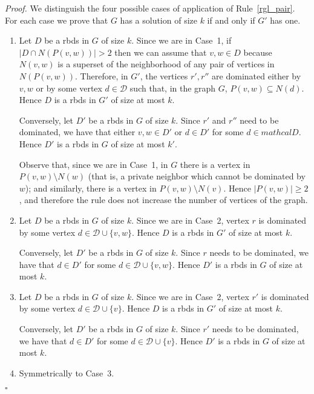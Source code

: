 \documentclass[a4paper,11pt]{article}
\newcommand{\rrgl}   [1] {Rule~\ref{#1}\xspace}
\newcommand{\drb}    [0] {rbds\xspace}
\newenvironment{proof}{\noindent \textit{Proof. }}{\hfill$\square$\vspace{.2cm}}
\begin{document}
\begin{proof}
We distinguish the four possible cases of application of \rrgl{rgl_pair}. For each case we prove that $G$ has a solution of size $k$ if and only if $G'$ has one.

\begin{enumerate}\itemsep0em
\item
Let $D$ be a \drb in $G$ of size $k$.
Since we are in Case~1, if $|D\cap N(P(v,w))| > 2$ then we can assume that $v,w \in D$ because $N(v,w)$ is a superset of the neighborhood of any pair of vertices in $N(P(v,w))$.
Therefore, in $G'$, the vertices $r',r''$ are dominated either by $v,w$ or by some vertex $d \in \mathcal{D}$ such that, in the graph $G$,  $P(v,w) \subseteq N(d)$. Hence $D$ is a \drb in $G'$ of size at most $k$.

Conversely, let $D'$ be a \drb in $G$ of size $k$.
Since $r'$ and $r''$ need to be dominated, we have that either $v,w \in D'$ or $d \in D'$ for some $d  \in mathcal{D}$. Hence $D'$ is a \drb in $G$ of size at most $k'$.

Observe that, since we are in Case~1, in $G$ there is a vertex in $P(v,w) \setminus N(w)$ (that is, a private neighbor which cannot be dominated by $w$); and similarly, there is a vertex in  $P(v,w) \setminus N(v)$. Hence $|P(v,w)| \geq 2$, and therefore the rule does not increase the number of vertices of the graph.

\item
Let $D$ be a \drb in $G$ of size $k$.
Since we are in Case~2, vertex $r$ is dominated by some vertex $d \in \mathcal{D} \cup \{v,w\}$.
Hence $D$ is a \drb in $G'$ of size at most $k$.

Conversely, let $D'$ be a \drb in $G$ of size $k$. Since $r$ needs to be dominated, we have that $d \in D'$ for some $d  \in \mathcal{D} \cup \{v,w\}$. Hence $D'$ is a \drb in $G$ of size at most $k$.

\item
Let $D$ be a \drb in $G$ of size $k$.
Since we are in Case~2,  vertex $r'$ is dominated by some vertex $d \in \mathcal{D} \cup \{v\}$.
Hence $D$ is a \drb in $G'$ of size at most $k$.

Conversely, let $D'$ be a \drb in $G$ of size $k$. Since $r'$ needs to be dominated, we have that $d \in D'$ for some $d  \in \mathcal{D} \cup \{v\}$. Hence $D'$ is a \drb in $G$ of size at most $k$.

\item Symmetrically to Case~3.
\end{enumerate}\vspace{-.6cm}
\end{proof}
\end{document}
